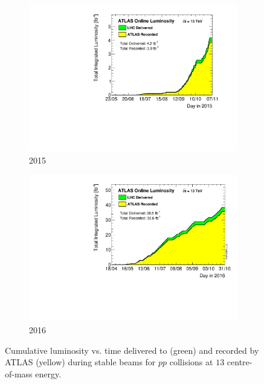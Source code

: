 \begin{figure}[htbp!]
\centering
\captionsetup{justification=centering}
	\hspace{-2cm}
    \begin{subfigure}[b]{0.35\textwidth}
        \includegraphics[width=\textwidth,angle=-90]{figures/detector/Lumi_2015}
        \caption{2015}
        \label{fig:Lumi_2015}
    \end{subfigure}
    \quad
    \quad
    \quad
    \quad
    \begin{subfigure}[b]{0.35\textwidth}
        \includegraphics[width=\textwidth,angle=-90]{figures/detector/Lumi_2016}
        \caption{2016}
        \label{fig:Lumi_2016}
    \end{subfigure}
\caption{Cumulative luminosity vs. time delivered to (green) and recorded by ATLAS (yellow) during stable beams for $pp$ collisions at $13$ \TeV centre-of-mass energy.}
\label{fig:Lumi}
\end{figure}







